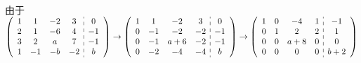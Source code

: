 	 \paragraph{} %
		 由于 \( \left(\begin{array}{cccc:c}
				 1 & 1  & -2 & 3  & 0  \\
				 2 & 1  & -6 & 4  & -1 \\
				 3 & 2  & a  & 7  & -1 \\
				 1 & -1 & -b & -2 & b
			 \end{array} \right)
		 \to
		 \left(\begin{array}{cccc:c}
				 1 & 1  & -2  & 3  & 0  \\
				 0 & -1 & -2  & -2 & -1 \\
				 0 & -1 & a+6 & -2 & -1 \\
				 0 & -2 & -4  & -4 & b
			 \end{array} \right)
		 \to
		 \left(\begin{array}{cccc:c}
				 1 & 0 & -4  & 1 & -1  \\
				 0 & 1 & 2   & 2 & 1   \\
				 0 & 0 & a+8 & 0 & 0   \\
				 0 & 0 & 0   & 0 & b+2
			 \end{array} \right) \)



